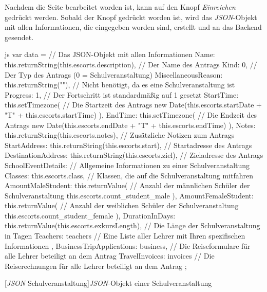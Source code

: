 \newpage
Nachdem die Seite bearbeitet worden ist, kann auf den Knopf \textit{Einreichen} gedrückt werden. Sobald der Knopf gedrückt worden ist, wird das \textit{JSON}-Objekt mit allen Informationen, die eingegeben worden sind, erstellt und an das Backend gesendet.
\begin{code}{js}
var data = {		// Das JSON-Objekt mit allen Informationen
	Name: this.returnString(this.escorts.description),	// Der Name des Antrags
	Kind: 0,	// Der Typ des Antrags (0 = Schulveranstaltung)
	MiscellaneousReason: this.returnString(""),			// Nicht benötigt, da es eine Schulveranstaltung ist
	Progress: 1,	// Der Fortschritt ist standardmäßig auf 1 gesetzt
	StartTime: this.setTimezone(	// Die Startzeit des Antrags
	new Date(this.escorts.startDate + "T" + this.escorts.startTime)
	),
	EndTime: this.setTimezone(	// Die Endzeit des Antrags
	new Date(this.escorts.endDate + "T" + this.escorts.endTime)
	),
	Notes: this.returnString(this.escorts.notes),	// Zusätzliche Notizen zum Antrags
	StartAddress: this.returnString(this.escorts.start),	// Startadresse des Antrags
	DestinationAddress: this.returnString(this.escorts.ziel), // Zieladresse des Antrags
	SchoolEventDetails: {	// Allgemeine Informationen zu einer Schulveranstaltung
		Classes: this.escorts.class,	// Klassen, die auf die Schulveranstaltung mitfahren
		AmountMaleStudent: this.returnValue(	// Anzahl der männlichen Schüler der Schulveranstaltung
		this.escorts.count_student_male
		),
		AmountFemaleStudent: this.returnValue(	// Anzahl der weiblichen Schüler der Schulveranstaltung
		this.escorts.count_student_female
		),
		DurationInDays: this.returnValue(this.escorts.exkursLength),	// Die Länge der Schulveranstaltung in Tagen
		Teachers: teachers	// Eine Liste aller Lehrer mit Ihren spezifischen Informationen
	},
	BusinessTripApplications: business,	// Die Reiseformulare für alle Lehrer beteiligt an dem Antrag
	TravelInvoices: invoices	// Die Reiserechnungen für alle Lehrer beteiligt an dem Antrag
};
\end{code}
[\textit{JSON} Schulveranstaltung]{\textit{JSON}-Objekt einer Schulveranstaltung}~\\
\newpage

